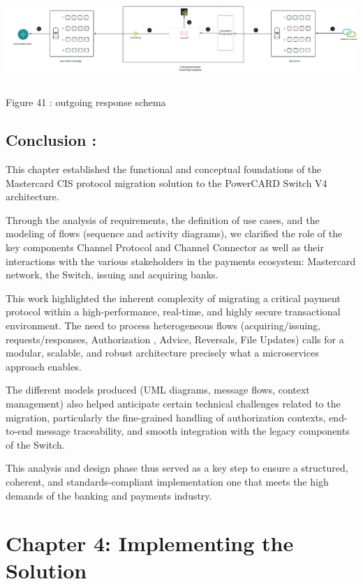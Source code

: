 \documentclass[12pt,a4paper]{report}
\begin{document}
\includegraphics[width=6.72766in,height=1.29849in]{vertopal_d1b0b2209edd4c6aa8254f57daa0953b/media/image60.png}

\protect\hypertarget{_Toc201954517}{}{}Figure 41 : outgoing response
schema

\hypertarget{conclusion-2}{%
\subsection{\texorpdfstring{\textbf{Conclusion
:}}{Conclusion :}}\label{conclusion-2}}

This chapter established the functional and conceptual foundations of
the Mastercard CIS protocol migration solution to the PowerCARD Switch
V4 architecture.

Through the analysis of requirements, the definition of use cases, and
the modeling of flows (sequence and activity diagrams), we clarified the
role of the key components Channel Protocol and Channel Connector as
well as their interactions with the various stakeholders in the payments
ecosystem: Mastercard network, the Switch, issuing and acquiring banks.

This work highlighted the inherent complexity of migrating a critical
payment protocol within a high-performance, real-time, and highly secure
transactional environment. The need to process heterogeneous flows
(acquiring/issuing, requests/responses, Authorization , Advice,
Reversals, File Updates) calls for a modular, scalable, and robust
architecture precisely what a microservices approach enables.

The different models produced (UML diagrams, message flows, context
management) also helped anticipate certain technical challenges related
to the migration, particularly the fine-grained handling of
authorization contexts, end-to-end message traceability, and smooth
integration with the legacy components of the Switch.

This analysis and design phase thus served as a key step to ensure a
structured, coherent, and standards-compliant implementation one that
meets the high demands of the banking and payments industry.

\hypertarget{chapter-4-implementing-the-solution}{%
\section{Chapter 4: Implementing the
Solution}\label{chapter-4-implementing-the-solution}}
\end{document}
